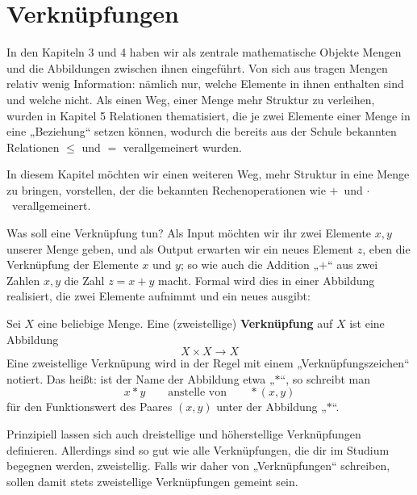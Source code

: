 %                                                                 
%
%
%
\section{Verknüpfungen}%

In den Kapiteln 3 und 4 haben wir als zentrale mathematische Objekte Mengen und die Abbildungen zwischen ihnen eingeführt. Von sich aus tragen Mengen relativ wenig Information: nämlich nur, welche Elemente in ihnen enthalten sind und welche nicht. Als einen Weg, einer Menge mehr Struktur zu verleihen, wurden in Kapitel 5 Relationen thematisiert, die je zwei Elemente einer Menge in eine „Beziehung“ setzen können, wodurch die bereits aus der Schule bekannten Relationen $\leq$ und $=$ verallgemeinert wurden.

In diesem Kapitel möchten wir einen weiteren Weg, mehr Struktur in eine Menge zu bringen, vorstellen, der die bekannten Rechenoperationen wie \glqq$+$\grqq\ und \glqq$\cdot$\grqq\ verallgemeinert.

Was soll eine Verknüpfung tun? Als Input möchten wir ihr zwei Elemente $x,y$ unserer Menge geben, und als Output erwarten wir ein neues Element $z$, eben die Verknüpfung der Elemente $x$ und $y$; so wie auch die Addition „$+$“ aus zwei Zahlen $x,y$ die Zahl $z=x+y$ macht. Formal wird dies in einer Abbildung realisiert, die zwei Elemente aufnimmt und ein neues ausgibt:

\begin{de}
	Sei $X$ eine beliebige Menge. Eine (zweistellige) \textbf{Verknüpfung} auf $X$ ist eine Abbildung
		\[ X\times X \to X  \]
Eine zweistellige Verknüpung wird in der Regel mit einem „Verknüpfungszeichen“ notiert. Das heißt: ist der Name der Abbildung etwa „$*$“, so schreibt man
\[ x*y \qquad\text{anstelle von}\qquad *(x,y) \]
für den Funktionswert des Paares $(x,y)$ unter der Abbildung „$*$“.
\end{de}

\begin{bem}[*]
 Prinzipiell lassen sich auch dreistellige und höherstellige Verknüpfungen definieren. Allerdings sind so gut wie alle Verknüpfungen, die dir im Studium begegnen werden, zweistellig. Falls wir daher von „Verknüpfungen“ schreiben, sollen damit stets zweistellige Verknüpfungen gemeint sein.
\end{bem}



